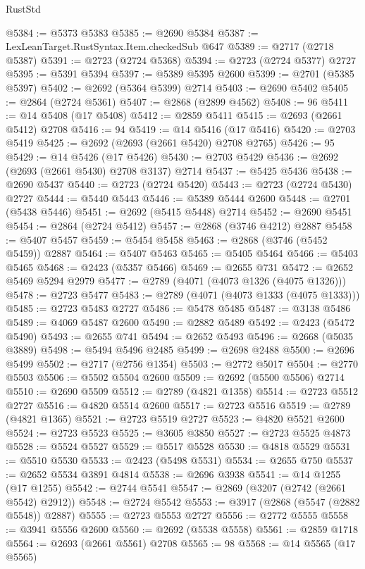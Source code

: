\begin{lexlean}{RustStd}
\begin{coremodule}
@5384 := @5373 @5383
@5385 := @2690 @5384
@5387 := LexLeanTarget.RustSyntax.Item.checkedSub @647
@5389 := @2717 (@2718 @5387)
@5391 := @2723 (@2724 @5368)
@5394 := @2723 (@2724 @5377) @2727
@5395 := @5391 @5394
@5397 := @5389 @5395 @2600
@5399 := @2701 (@5385 @5397)
@5402 := @2692 (@5364 @5399) @2714
@5403 := @2690 @5402
@5405 := @2864 (@2724 @5361)
@5407 := @2868 (@2899 @4562)
@5408 := 96
@5411 := @14 @5408 (@17 @5408)
@5412 := @2859 @5411
@5415 := @2693 (@2661 @5412) @2708
@5416 := 94
@5419 := @14 @5416 (@17 @5416)
@5420 := @2703 @5419
@5425 := @2692 (@2693 (@2661 @5420) @2708 @2765)
@5426 := 95
@5429 := @14 @5426 (@17 @5426)
@5430 := @2703 @5429
@5436 := @2692 (@2693 (@2661 @5430) @2708 @3137) @2714
@5437 := @5425 @5436
@5438 := @2690 @5437
@5440 := @2723 (@2724 @5420)
@5443 := @2723 (@2724 @5430) @2727
@5444 := @5440 @5443
@5446 := @5389 @5444 @2600
@5448 := @2701 (@5438 @5446)
@5451 := @2692 (@5415 @5448) @2714
@5452 := @2690 @5451
@5454 := @2864 (@2724 @5412)
@5457 := @2868 (@3746 @4212) @2887
@5458 := @5407 @5457
@5459 := @5454 @5458
@5463 := @2868 (@3746 (@5452 @5459)) @2887
@5464 := @5407 @5463
@5465 := @5405 @5464
@5466 := @5403 @5465
@5468 := @2423 (@5357 @5466)
@5469 := @2655 @731
@5472 := @2652 @5469 @5294 @2979
@5477 := @2789 (@4071 (@4073 @1326 (@4075 @1326)))
@5478 := @2723 @5477
@5483 := @2789 (@4071 (@4073 @1333 (@4075 @1333)))
@5485 := @2723 @5483 @2727
@5486 := @5478 @5485
@5487 := @3138 @5486
@5489 := @4069 @5487 @2600
@5490 := @2882 @5489
@5492 := @2423 (@5472 @5490)
@5493 := @2655 @741
@5494 := @2652 @5493
@5496 := @2668 (@5035 @3889)
@5498 := @5494 @5496 @2485
@5499 := @2698 @2488
@5500 := @2696 @5499
@5502 := @2717 (@2756 @1354)
@5503 := @2772 @5017
@5504 := @2770 @5503
@5506 := @5502 @5504 @2600
@5509 := @2692 (@5500 @5506) @2714
@5510 := @2690 @5509
@5512 := @2789 (@4821 @1358)
@5514 := @2723 @5512 @2727
@5516 := @4820 @5514 @2600
@5517 := @2723 @5516
@5519 := @2789 (@4821 @1365)
@5521 := @2723 @5519 @2727
@5523 := @4820 @5521 @2600
@5524 := @2723 @5523
@5525 := @3605 @3850
@5527 := @2723 @5525 @4873
@5528 := @5524 @5527
@5529 := @5517 @5528
@5530 := @4818 @5529
@5531 := @5510 @5530
@5533 := @2423 (@5498 @5531)
@5534 := @2655 @750
@5537 := @2652 @5534 @3891 @4814
@5538 := @2696 @3938
@5541 := @14 @1255 (@17 @1255)
@5542 := @2744 @5541
@5547 := @2869 (@3207 (@2742 (@2661 @5542) @2912))
@5548 := @2724 @5542
@5553 := @3917 (@2868 (@5547 (@2882 @5548)) @2887)
@5555 := @2723 @5553 @2727
@5556 := @2772 @5555
@5558 := @3941 @5556 @2600
@5560 := @2692 (@5538 @5558)
@5561 := @2859 @1718
@5564 := @2693 (@2661 @5561) @2708
@5565 := 98
@5568 := @14 @5565 (@17 @5565)

\end{coremodule}
\end{lexlean}
